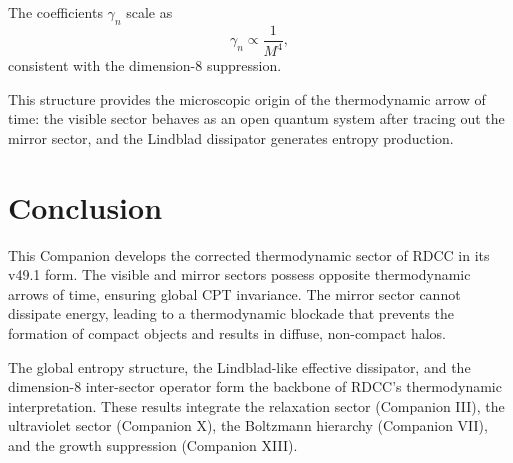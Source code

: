 \documentclass[11pt,a4paper]{article}
\begin{document}
The coefficients $\gamma_n$ scale as
\begin{equation}
\gamma_n \propto \frac{1}{M^4},
\end{equation}
consistent with the dimension-8 suppression.

This structure provides the microscopic origin of the thermodynamic arrow of
time: the visible sector behaves as an open quantum system after tracing out the
mirror sector, and the Lindblad dissipator generates entropy production.

\section{Conclusion}

This Companion develops the corrected thermodynamic sector of RDCC in its
v49.1 form. The visible and mirror sectors possess opposite thermodynamic
arrows of time, ensuring global CPT invariance. The mirror sector cannot
dissipate energy, leading to a thermodynamic blockade that prevents the
formation of compact objects and results in diffuse, non-compact halos.

The global entropy structure, the Lindblad-like effective dissipator, and the
dimension-8 inter-sector operator form the backbone of RDCC's thermodynamic
interpretation. These results integrate the relaxation sector (Companion III),
the ultraviolet sector (Companion X), the Boltzmann hierarchy (Companion VII),
and the growth suppression (Companion XIII).
\end{document}
